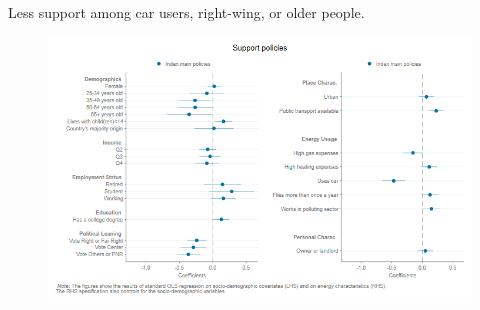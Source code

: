 \begin{framefont}{\small}
\begin{frame}{Less support among car users, right-wing, or older people.
	}

\begin{figure}
	\vspace{-.2cm}
	\includegraphics[width=.86\paperwidth]{../figures/FR/Coefplot_SetAB_index_main_policies.png}
\end{figure}
\end{frame}





\end{framefont}

